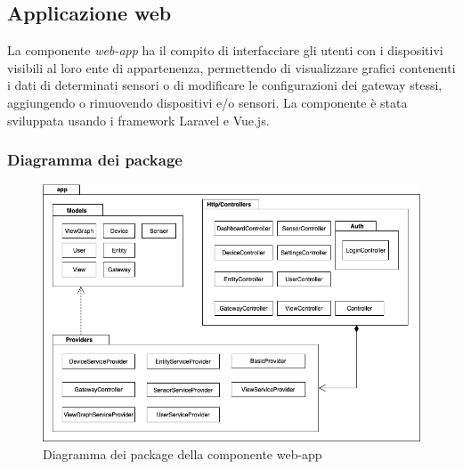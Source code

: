 \subsection{Applicazione web}
La componente \textit{web-app} ha il compito di interfacciare gli utenti con i dispositivi visibili al loro ente di appartenenza, permettendo di visualizzare grafici contenenti i dati di determinati sensori o di modificare le configurazioni dei gateway stessi, aggiungendo o rimuovendo dispositivi e/o sensori. 
La componente è stata sviluppata usando i framework Laravel e Vue.js.

	\subsubsection{Diagramma dei package}%
		\begin{figure}[H]
			\centering
			\includegraphics[scale=0.600]{res/images/WEBAPP/WebAppPackage.png}
			\caption{Diagramma dei package della componente web-app}
		\end{figure}

